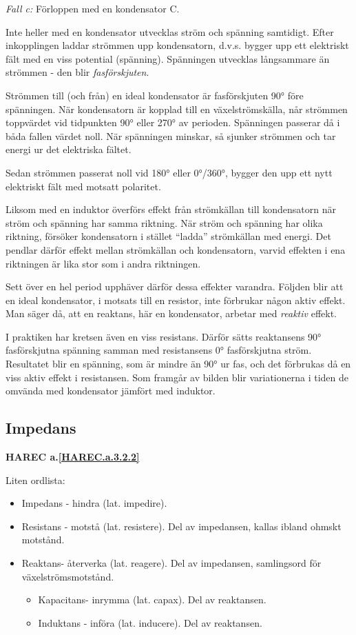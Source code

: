 \emph{Fall c:} Förloppen med en kondensator C.

Inte heller med en kondensator utvecklas ström och spänning samtidigt. Efter
inkopplingen laddar strömmen upp kondensatorn, d.v.s. bygger upp ett elektriskt
fält med en viss potential (spänning). Spänningen utvecklas långsammare än
strömmen - den blir \emph{fasförskjuten}.

Strömmen till (och från) en ideal kondensator är fasförskjuten 90° före
spänningen. När kondensatorn är kopplad till en växelströmskälla, når strömmen
toppvärdet vid tidpunkten 90° eller 270° av perioden. Spänningen passerar då i
båda fallen värdet noll. När spänningen minskar, så sjunker strömmen och tar
energi ur det elektriska fältet.

Sedan strömmen passerat noll vid 180° eller 0°/360°, bygger den upp ett nytt
elektriskt fält med motsatt polaritet.

Liksom med en induktor överförs effekt från strömkällan till kondensatorn när
ström och spänning har samma riktning. När ström och spänning har olika
riktning, försöker kondensatorn i stället ``ladda'' strömkällan med energi. Det
pendlar därför effekt mellan strömkällan och kondensatorn, varvid effekten i
ena riktningen är lika stor som i andra riktningen.

Sett över en hel period upphäver därför dessa effekter varandra. Följden blir
att en ideal kondensator, i motsats till en resistor, inte förbrukar någon
aktiv effekt. Man säger då, att en reaktans, här en kondensator, arbetar med
\emph{reaktiv} effekt.

I praktiken har kretsen även en viss resistans. Därför sätts reaktansens 90°
fasförskjutna spänning samman med resistansens 0° fasförskjutna ström.
Resultatet blir en spänning, som är mindre än 90° ur fas, och det förbrukas då
en viss aktiv effekt i resistansen. Som framgår av bilden blir variationerna i
tiden de omvända med kondensator jämfört med induktor.

\subsection{Impedans}
\textbf{HAREC a.\ref{HAREC.a.3.2.2}\label{myHAREC.a.3.2.2}}

Liten ordlista:
\begin{itemize}
\item Impedans - hindra (lat. impedire).
\item Resistans - motstå (lat. resistere).
  Del av impedansen, kallas ibland ohmskt motstånd.
\item Reaktans- återverka (lat. reagere).
  Del av impedansen, samlingsord för växelströmsmotstånd.
  \begin{itemize}
  \item Kapacitans- inrymma (lat. capax). Del av reaktansen.
  \item Induktans - införa (lat. inducere). Del av reaktansen.
  \end{itemize}
\end{itemize}

